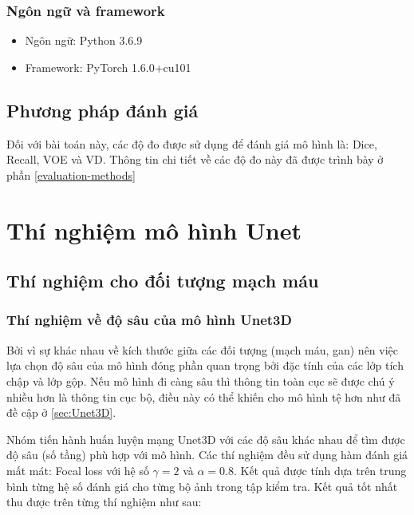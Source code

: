 \subsubsection*{Ngôn ngữ và framework}
\begin{itemize}[topsep=0pt]
    \item Ngôn ngữ: Python 3.6.9
    \item Framework: PyTorch 1.6.0+cu101
\end{itemize}

\subsection{Phương pháp đánh giá}
Đối với bài toán này, các độ đo được sử dụng để đánh giá mô hình là: Dice, Recall, VOE và VD. Thông tin chi tiết về các độ đo này đã được trình bày ở phần \ref{evaluation-methods}

\section{Thí nghiệm mô hình Unet}

\subsection{Thí nghiệm cho đối tượng mạch máu}
\subsubsection{Thí nghiệm về độ sâu của mô hình Unet3D}
Bởi vì sự khác nhau về kích thước giữa các đối tượng (mạch máu, gan) nên việc lựa chọn độ sâu của mô hình đóng phần quan trọng bởi đặc tính của các lớp tích chập và lớp gộp. Nếu mô hình đi càng sâu thì thông tin toàn cục sẽ được chú ý nhiều hơn là thông tin cục bộ, điều này có thể khiến cho mô hình tệ hơn như đã đề cập ở \ref{sec:Unet3D}. 

Nhóm tiến hành huấn luyện mạng Unet3D với các độ sâu khác nhau để tìm được độ sâu (số tầng) phù hợp với mô hình. Các thí nghiệm đều sử dụng hàm đánh giá mất mát: Focal loss với hệ số $\gamma=2$ và $\alpha=0.8$. Kết quả được tính dựa trên trung bình từng hệ số đánh giá cho từng bộ ảnh trong tập kiểm tra. Kết quả tốt nhất thu được trên từng thí nghiệm như sau:

